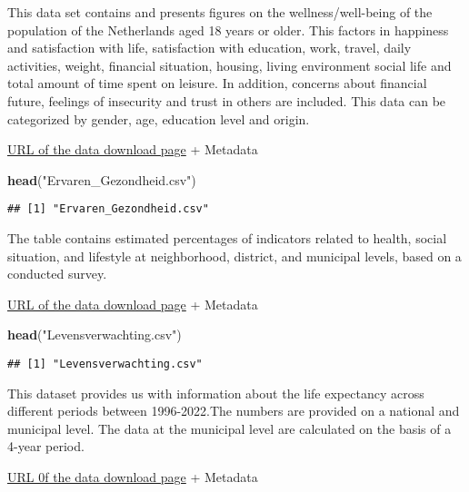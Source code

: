\documentclass[
]{article}
\newenvironment{Shaded}{\begin{snugshade}}{\end{snugshade}}
\newcommand{\FunctionTok}[1]{\textcolor[rgb]{0.13,0.29,0.53}{\textbf{#1}}}
\newcommand{\NormalTok}[1]{#1}
\newcommand{\StringTok}[1]{\textcolor[rgb]{0.31,0.60,0.02}{#1}}
\begin{document}
This data set contains and presents figures on the wellness/well-being
of the population of the Netherlands aged 18 years or older. This
factors in happiness and satisfaction with life, satisfaction with
education, work, travel, daily activities, weight, financial situation,
housing, living environment social life and total amount of time spent
on leisure. In addition, concerns about financial future, feelings of
insecurity and trust in others are included. This data can be
categorized by gender, age, education level and origin.

\href{https://opendata.cbs.nl/statline/portal.html?_la=nl&_catalog=CBS&tableId=85542NED&_theme=178}{URL
of the data download page} + Metadata

\begin{Shaded}
\begin{Highlighting}[]
\FunctionTok{head}\NormalTok{(}\StringTok{"Ervaren\_Gezondheid.csv"}\NormalTok{)}
\end{Highlighting}
\end{Shaded}

\begin{verbatim}
## [1] "Ervaren_Gezondheid.csv"
\end{verbatim}

The table contains estimated percentages of indicators related to
health, social situation, and lifestyle at neighborhood, district, and
municipal levels, based on a conducted survey.

\href{https://statline.rivm.nl/portal.html?_la=nl&_catalog=RIVM&tableId=50120NED&_theme=94}{URL
of the data download page} + Metadata

\begin{Shaded}
\begin{Highlighting}[]
\FunctionTok{head}\NormalTok{(}\StringTok{"Levensverwachting.csv"}\NormalTok{)}
\end{Highlighting}
\end{Shaded}

\begin{verbatim}
## [1] "Levensverwachting.csv"
\end{verbatim}

This dataset provides us with information about the life expectancy
across different periods between 1996-2022.The numbers are provided on a
national and municipal level. The data at the municipal level are
calculated on the basis of a 4-year period.

\href{(https://statline.rivm.nl/portal.html?_la=nl&_catalog=RIVM&tableId=50132NED&_theme=101)}{URL
0f the data download page} + Metadata
\end{document}
